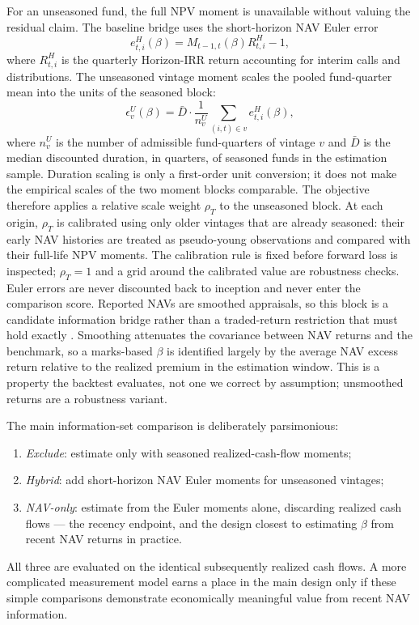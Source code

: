 \documentclass[11pt]{article}
\begin{document}
For an unseasoned fund, the full NPV moment is unavailable without valuing the
residual claim. The baseline bridge uses the short-horizon NAV Euler error
\[
e^H_{t,i}(\beta)
=
M_{t-1,t}(\beta)R^H_{t,i}-1,
\]
where $R^H_{t,i}$ is the quarterly Horizon-IRR return accounting for interim
calls and distributions. The unseasoned vintage moment scales the pooled
fund-quarter mean into the units of the seasoned block:
\[
\epsilon_v^U(\beta)
=
\bar D\cdot
\frac{1}{n_v^U}\sum_{(i,t)\in v}e^H_{t,i}(\beta),
\]
where $n_v^U$ is the number of admissible fund-quarters of vintage $v$ and
$\bar D$ is the median discounted duration, in quarters, of seasoned funds in
the estimation sample. Duration scaling is only a first-order unit conversion;
it does not make the empirical scales of the two moment blocks comparable. The
objective therefore applies a relative scale weight $\rho_T$ to the
unseasoned block. At each origin, $\rho_T$ is calibrated using only older
vintages that are already seasoned: their early NAV histories are treated as
pseudo-young observations and compared with their full-life NPV moments. The
calibration rule is fixed before forward loss is inspected; $\rho_T=1$ and a
grid around the calibrated value are robustness checks. Euler errors are
never discounted back to inception and never enter the comparison score.
Reported NAVs are smoothed appraisals, so this block is a candidate
information bridge rather than a traded-return restriction that must hold
exactly \citep{brown2023nowcasting}. Smoothing attenuates the covariance
between NAV returns and the benchmark, so a marks-based $\beta$ is identified
largely by the average NAV excess return relative to the realized premium in
the estimation window. This is a property the backtest evaluates, not one we
correct by assumption; unsmoothed returns are a robustness variant.

The main information-set comparison is deliberately parsimonious:
\begin{enumerate}
\item \emph{Exclude}: estimate only with seasoned realized-cash-flow moments;
\item \emph{Hybrid}: add short-horizon NAV Euler moments for unseasoned
      vintages;
\item \emph{NAV-only}: estimate from the Euler moments alone, discarding
      realized cash flows --- the recency endpoint, and the design closest to
      estimating $\beta$ from recent NAV returns in practice.
\end{enumerate}
All three are evaluated on the identical subsequently realized cash flows. A
more complicated measurement model earns a place in the main design only if
these simple comparisons demonstrate economically meaningful value from recent
NAV information.
\end{document}
